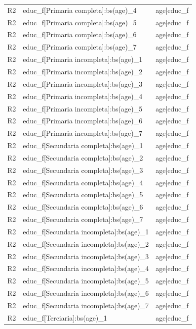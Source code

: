 \begin{longtable}{lll}
R2 & educ\_f[Primaria completa]:bs(age)\_4 & age|educ\_f \\
R2 & educ\_f[Primaria completa]:bs(age)\_5 & age|educ\_f \\
R2 & educ\_f[Primaria completa]:bs(age)\_6 & age|educ\_f \\
R2 & educ\_f[Primaria completa]:bs(age)\_7 & age|educ\_f \\
R2 & educ\_f[Primaria incompleta]:bs(age)\_1 & age|educ\_f \\
R2 & educ\_f[Primaria incompleta]:bs(age)\_2 & age|educ\_f \\
R2 & educ\_f[Primaria incompleta]:bs(age)\_3 & age|educ\_f \\
R2 & educ\_f[Primaria incompleta]:bs(age)\_4 & age|educ\_f \\
R2 & educ\_f[Primaria incompleta]:bs(age)\_5 & age|educ\_f \\
R2 & educ\_f[Primaria incompleta]:bs(age)\_6 & age|educ\_f \\
R2 & educ\_f[Primaria incompleta]:bs(age)\_7 & age|educ\_f \\
R2 & educ\_f[Secundaria completa]:bs(age)\_1 & age|educ\_f \\
R2 & educ\_f[Secundaria completa]:bs(age)\_2 & age|educ\_f \\
R2 & educ\_f[Secundaria completa]:bs(age)\_3 & age|educ\_f \\
R2 & educ\_f[Secundaria completa]:bs(age)\_4 & age|educ\_f \\
R2 & educ\_f[Secundaria completa]:bs(age)\_5 & age|educ\_f \\
R2 & educ\_f[Secundaria completa]:bs(age)\_6 & age|educ\_f \\
R2 & educ\_f[Secundaria completa]:bs(age)\_7 & age|educ\_f \\
R2 & educ\_f[Secundaria incompleta]:bs(age)\_1 & age|educ\_f \\
R2 & educ\_f[Secundaria incompleta]:bs(age)\_2 & age|educ\_f \\
R2 & educ\_f[Secundaria incompleta]:bs(age)\_3 & age|educ\_f \\
R2 & educ\_f[Secundaria incompleta]:bs(age)\_4 & age|educ\_f \\
R2 & educ\_f[Secundaria incompleta]:bs(age)\_5 & age|educ\_f \\
R2 & educ\_f[Secundaria incompleta]:bs(age)\_6 & age|educ\_f \\
R2 & educ\_f[Secundaria incompleta]:bs(age)\_7 & age|educ\_f \\
R2 & educ\_f[Terciaria]:bs(age)\_1 & age|educ\_f \\

\end{longtable}
